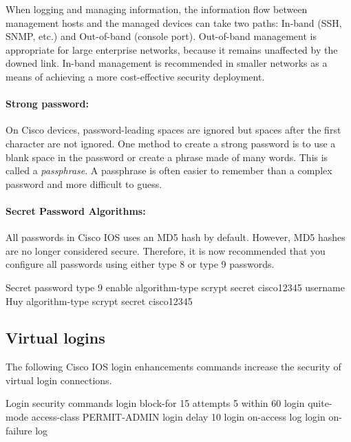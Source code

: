 When logging and managing information, the information flow between management hosts and the managed devices can take two paths: In-band (SSH, SNMP, etc.) and Out-of-band (console port). Out-of-band management is appropriate for large enterprise networks, because it remains unaffected by the downed link. In-band management is recommended in smaller networks as a means of achieving a more cost-effective security deployment.

\paragraph{Strong password:} 

On Cisco devices, password-leading spaces are ignored but spaces after the first character are not ignored. One method to create a strong password is to use a blank space in the password or create a phrase made of many words. This is called a \emph{passphrase}. A passphrase is often easier to remember than a complex password and more difficult to guess.

\paragraph{Secret Password Algorithms:} 

All passwords in Cisco IOS uses an MD5 hash by default. However, MD5 hashes are no longer considered secure. Therefore, it is now recommended that you configure all passwords using either type 8  or type 9  passwords.

\begin{sexylisting}{Secret password type 9}
enable algorithm-type scrypt secret cisco12345
username Huy algorithm-type scrypt secret cisco12345
\end{sexylisting}


\subsection{Virtual logins}

The following Cisco IOS login enhancements commands increase the security of virtual login connections.

\begin{sexylisting}{Login security commands}
login block-for 15 attempts 5 within 60
login quite-mode access-class PERMIT-ADMIN
login delay 10
login on-access log
login on-failure log
\end{sexylisting}

